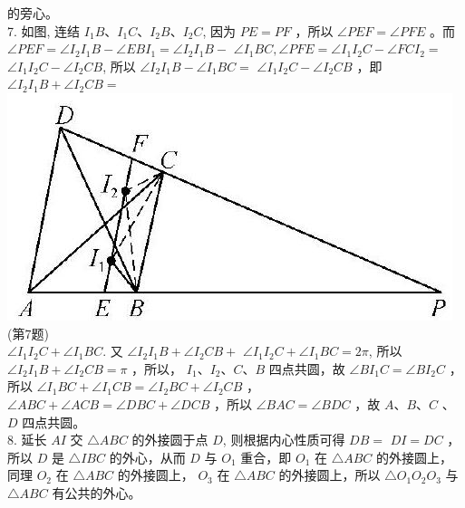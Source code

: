 \documentclass[10pt]{article}
\begin{document}
的旁心。\\
7. 如图, 连结 $I_{1} B 、 I_{1} C 、 I_{2} B 、 I_{2} C$, 因为 $P E=P F$ ，所以 $\angle P E F=\angle P F E$ 。而 $\angle P E F=\angle I_{2} I_{1} B-\angle E B I_{1}=\angle I_{2} I_{1} B-$ $\angle I_{1} B C, \angle P F E=\angle I_{1} I_{2} C-\angle F C I_{2}=$ $\angle I_{1} I_{2} C-\angle I_{2} C B$, 所以 $\angle I_{2} I_{1} B-\angle I_{1} B C=$ $\angle I_{1} I_{2} C-\angle I_{2} C B$ ，即 $\angle I_{2} I_{1} B+\angle I_{2} C B=$\\
\includegraphics[max width=\textwidth, center]{2024_10_30_66b8e5e701da2093c133g-106}\\
(第7题)\\
$\angle I_{1} I_{2} C+\angle I_{1} B C$. 又 $\angle I_{2} I_{1} B+\angle I_{2} C B+$ $\angle I_{1} I_{2} C+\angle I_{1} B C=2 \pi$, 所以 $\angle I_{2} I_{1} B+\angle I_{2} C B=\pi$ ，所以， $I_{1} 、 I_{2} 、 C 、 B$ 四点共圆，故 $\angle B I_{1} C=\angle B I_{2} C$ ，所以 $\angle I_{1} B C+\angle I_{1} C B=\angle I_{2} B C+\angle I_{2} C B$ ， $\angle A B C+\angle A C B=\angle D B C+\angle D C B$ ，所以 $\angle B A C=\angle B D C$ ，故 $A 、 B 、 C$ 、 $D$ 四点共圆。\\
8. 延长 $A I$ 交 $\triangle A B C$ 的外接圆于点 $D$, 则根据内心性质可得 $D B=$ $D I=D C$ ，所以 $D$ 是 $\triangle I B C$ 的外心，从而 $D$ 与 $O_{1}$ 重合，即 $O_{1}$ 在 $\triangle A B C$ 的外接圆上，同理 $O_{2}$ 在 $\triangle A B C$ 的外接圆上， $O_{3}$ 在 $\triangle A B C$ 的外接圆上，所以 $\triangle O_{1} O_{2} O_{3}$ 与 $\triangle A B C$ 有公共的外心。\\
\end{document}
